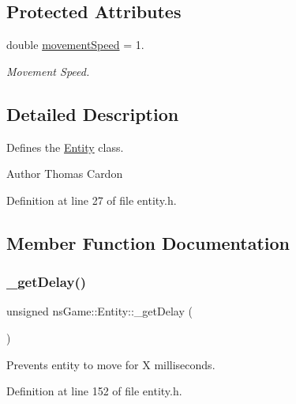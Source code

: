 \subsection*{Protected Attributes}
\begin{DoxyCompactItemize}
\item 
double \hyperlink{structns_game_1_1_entity_a2b5d83f01bdc1d58673b3fae9afe704e}{movement\+Speed} = 1.
\begin{DoxyCompactList}\small\item\em Movement Speed. \end{DoxyCompactList}\end{DoxyCompactItemize}


\subsection{Detailed Description}
Defines the \hyperlink{structns_game_1_1_entity}{Entity} class. 

\begin{DoxyAuthor}{Author}
Thomas Cardon 
\end{DoxyAuthor}


Definition at line 27 of file entity.\+h.



\subsection{Member Function Documentation}
\mbox{\label{structns_game_1_1_entity_a0c574fba3e12b9bb976d72953626e550}} 
\subsubsection{\texorpdfstring{\+\_\+get\+Delay()}{\_getDelay()}}
{\footnotesize\ttfamily unsigned ns\+Game\+::\+Entity\+::\+\_\+get\+Delay (\begin{DoxyParamCaption}{ }\end{DoxyParamCaption})\hspace{0.3cm}{\ttfamily [inline]}}



Prevents entity to move for X milliseconds. 



Definition at line 152 of file entity.\+h.

